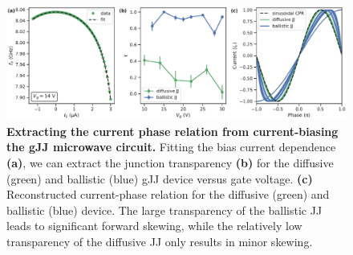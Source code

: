 \begin{figure}
	\centering
	\includegraphics[width=\linewidth]{chapter-gJJ-CPR/figs/Figure6}
	\caption{
		\textbf{Extracting the current phase relation from current-biasing the gJJ microwave circuit.}
		Fitting the bias current dependence \textbf{(a)}, we can extract the junction transparency \textbf{(b)} for the diffusive (green) and ballistic (blue) gJJ device versus gate voltage.
		\textbf{(c)} Reconstructed current-phase relation for the diffusive (green) and ballistic (blue) device.
		The large transparency of the ballistic JJ leads to significant forward skewing, while the relatively low transparency of the diffusive JJ only results in minor skewing.
	}
	\label{fig:figure6}
\end{figure}





